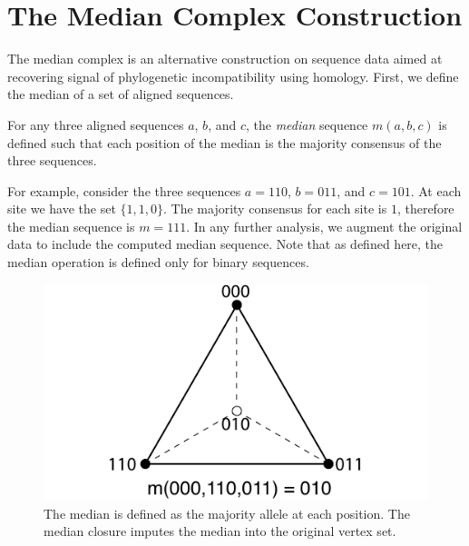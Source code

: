 \section{The Median Complex Construction}
\label{complex_construction:median_complex}

The median complex is an alternative construction on sequence data aimed at recovering signal of phylogenetic incompatibility using homology.
First, we define the median of a set of aligned sequences.

\begin{defn}
  \label{defn:median}
  For any three aligned sequences $a$, $b$, and $c$, the \emph{median} sequence $m(a,b,c)$ is defined such that each position of the median is the majority consensus of the three sequences.
\end{defn}

For example, consider the three sequences $a=110$, $b=011$, and $c=101$.
At each site we have the set $\{1,1,0\}$.
The majority consensus for each site is $1$, therefore the median sequence is $m=111$.
In any further analysis, we augment the original data to include the computed median sequence.
Note that as defined here, the median operation is defined only for binary sequences.

\begin{figure}
\centering
\includegraphics[width=.75\columnwidth]{./fig/complex_construction/median.pdf}
\caption[The Median Operation on Binary Sequences]{The median is defined as the majority allele at each position. The median closure imputes the median into the original vertex set.}
\label{fig:complex_construction:median}
\end{figure}

